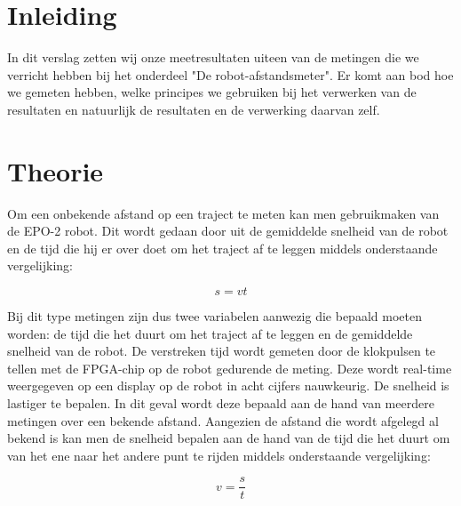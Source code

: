\documentclass{report}
\begin{document}
\chapter{Inleiding}
In dit verslag zetten wij onze meetresultaten uiteen van de metingen die we verricht hebben bij het onderdeel "De robot-afstandsmeter". Er komt aan bod hoe we gemeten hebben, welke principes we gebruiken bij het verwerken van de resultaten en natuurlijk de resultaten en de verwerking daarvan zelf.
\chapter{Theorie}
Om een onbekende afstand op een traject te meten kan men gebruikmaken van de EPO-2 robot. Dit wordt gedaan door uit de gemiddelde snelheid van de robot en de tijd 
die hij er over doet om het traject af te leggen middels onderstaande vergelijking:

\begin{equation}
s = vt
\end{equation}

Bij dit type metingen zijn dus twee variabelen aanwezig die bepaald moeten worden: de tijd die het duurt om het traject af te leggen en de gemiddelde snelheid van de robot. 
De verstreken tijd wordt gemeten door de klokpulsen te tellen met de FPGA-chip op de robot gedurende de meting. Deze wordt real-time weergegeven op een display op de robot in acht cijfers nauwkeurig.
De snelheid is lastiger te bepalen. In dit geval wordt deze bepaald aan de hand van meerdere metingen over een bekende afstand. Aangezien de afstand die wordt afgelegd al bekend is kan men de snelheid bepalen aan de hand van de tijd die het duurt om van het ene naar het andere punt te rijden middels onderstaande vergelijking:

\begin{equation}
\label{eq:vel}
v=\frac{s}{t}
\end{equation}
\end{document}
